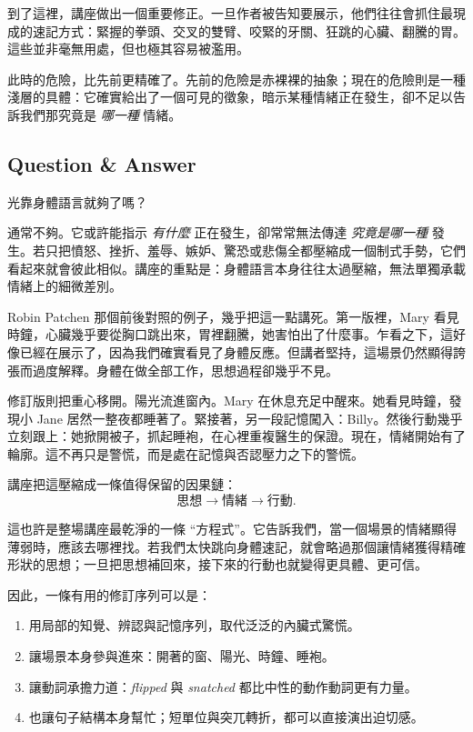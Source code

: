 到了這裡，講座做出一個重要修正。一旦作者被告知要展示，他們往往會抓住最現成的速記方式：緊握的拳頭、交叉的雙臂、咬緊的牙關、狂跳的心臟、翻騰的胃。這些並非毫無用處，但也極其容易被濫用。

此時的危險，比先前更精確了。先前的危險是赤裸裸的抽象；現在的危險則是一種淺層的具體：它確實給出了一個可見的徵象，暗示某種情緒正在發生，卻不足以告訴我們那究竟是 \emph{哪一種} 情緒。

\subsection{Question \& Answer}

光靠身體語言就夠了嗎？

通常不夠。它或許能指示 \emph{有什麼} 正在發生，卻常常無法傳達 \emph{究竟是哪一種} 發生。若只把憤怒、挫折、羞辱、嫉妒、驚恐或悲傷全都壓縮成一個制式手勢，它們看起來就會彼此相似。講座的重點是：身體語言本身往往太過壓縮，無法單獨承載情緒上的細微差別。

Robin Patchen 那個前後對照的例子，幾乎把這一點講死。第一版裡，Mary 看見時鐘，心臟幾乎要從胸口跳出來，胃裡翻騰，她害怕出了什麼事。乍看之下，這好像已經在展示了，因為我們確實看見了身體反應。但講者堅持，這場景仍然顯得誇張而過度解釋。身體在做全部工作，思想過程卻幾乎不見。

修訂版則把重心移開。陽光流進窗內。Mary 在休息充足中醒來。她看見時鐘，發現小 Jane 居然一整夜都睡著了。緊接著，另一段記憶闖入：Billy。然後行動幾乎立刻跟上：她掀開被子，抓起睡袍，在心裡重複醫生的保證。現在，情緒開始有了輪廓。這不再只是警慌，而是處在記憶與否認壓力之下的警慌。

講座把這壓縮成一條值得保留的因果鏈：
\begin{equation}
\text{思想} \to \text{情緒} \to \text{行動}.
\end{equation}

這也許是整場講座最乾淨的一條 ``方程式''。它告訴我們，當一個場景的情緒顯得薄弱時，應該去哪裡找。若我們太快跳向身體速記，就會略過那個讓情緒獲得精確形狀的思想；一旦把思想補回來，接下來的行動也就變得更具體、更可信。

因此，一條有用的修訂序列可以是：
\begin{enumerate}
\item 用局部的知覺、辨認與記憶序列，取代泛泛的內臟式驚慌。
\item 讓場景本身參與進來：開著的窗、陽光、時鐘、睡袍。
\item 讓動詞承擔力道：\emph{flipped} 與 \emph{snatched} 都比中性的動作動詞更有力量。
\item 也讓句子結構本身幫忙；短單位與突兀轉折，都可以直接演出迫切感。
\end{enumerate}

